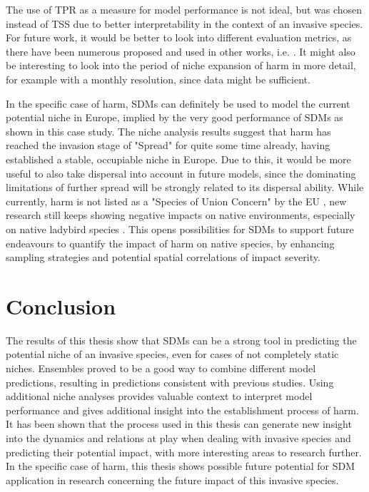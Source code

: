 \documentclass[12pt,a4paper]{article}
\begin{document}
The use of TPR as a measure for model performance is not ideal, but was chosen instead of TSS due to better interpretability in the context of an invasive species.
For future work, it would be better to look into different evaluation metrics, as there have been numerous proposed and used in other works, i.e. \autocite{konowalik2021SDMmetrics}.
It might also be interesting to look into the period of niche expansion of \gls{harm} in more detail, for example with a monthly resolution, since data might be sufficient.  

In the specific case of \gls{harm}, SDMs can definitely be used to model the current potential niche in Europe, implied by the very good performance of SDMs as shown in this case study.
The niche analysis results suggest that \gls{harm} has reached the invasion stage of "Spread" for quite some time already, having established a stable, occupiable niche in Europe.
Due to this, it would be more useful to also take dispersal into account in future models, since the dominating limitations of further spread will be strongly related to its dispersal ability.
While currently, \gls{harm} is not listed as a "Species of Union Concern" by the EU \autocite{EU2020speciesofunionconcern}, new research still keeps showing negative impacts on native environments, especially on native ladybird species \autocite{brown2022harmimpactigp}.
This opens possibilities for SDMs to support future endeavours to quantify the impact of \gls{harm} on native species, by enhancing sampling strategies and potential spatial correlations of impact severity.

\section{Conclusion} \label{sec:conclusion}
The results of this thesis show that SDMs can be a strong tool in predicting the potential niche of an invasive species, even for cases of not completely static niches.
Ensembles proved to be a good way to combine different model predictions, resulting in predictions consistent with previous studies.
Using additional niche analyses provides valuable context to interpret model performance and gives additional insight into the establishment process of \gls{harm}.
It has been shown that the process used in this thesis can generate new insight into the dynamics and relations at play when dealing with invasive species and predicting their potential impact, with more interesting areas to research further.
In the specific case of \gls{harm}, this thesis shows possible future potential for SDM application in research concerning the future impact of this invasive species.
\end{document}
